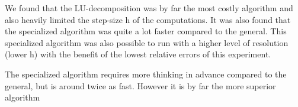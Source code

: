 We found that the LU-decomposition was by far the most costly algorithm and also heavily limited the step-size h of the computations. It was also found that the specialized algorithm was quite a lot faster compared to the general. This specialized algorithm was also possible to run with a higher level of resolution (lower h) with the benefit of the lowest relative errors of this experiment. 

The specialized algorithm requires more thinking in advance compared to the general, but is around twice as fast. However it is by far the more superior algorithm
